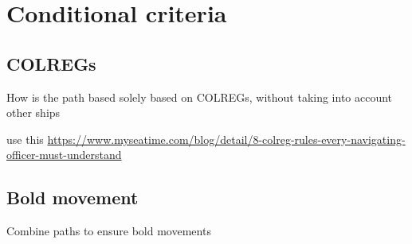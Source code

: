 \section{Conditional criteria}

\subsection{COLREGs}
How is the path based solely based on COLREGs, without taking into account other ships

use this \url{https://www.myseatime.com/blog/detail/8-colreg-rules-every-navigating-officer-must-understand}

\subsection{Bold movement}
Combine paths to ensure bold movements


